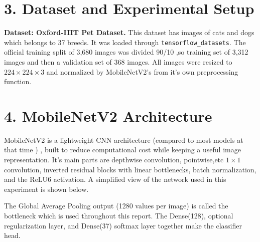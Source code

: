 \documentclass[10pt]{article}
\begin{document}
\section*{3. Dataset and Experimental Setup}

\textbf{Dataset: Oxford-IIIT Pet Dataset.} This dataset has  images of cats and dogs
which belongs to 37 breeds. It was loaded through \texttt{tensorflow\_datasets}. The official
training split of 3,680 images was divided 90/10 ,so training set of 3,312 images and then a 
validation set of 368 images.  All images were resized to $224 \times 224 \times 3$
and normalized by  MobileNetV2's from it's own preprocessing function.



\section*{4. MobileNetV2 Architecture}

MobileNetV2 is a lightweight CNN architecture (compared to most models at that time ) ,  built to reduce computational cost while keeping
a useful image representation. It's main parts  are depthwise convolution, pointwise,etc
$1 \times 1$ convolution, inverted residual blocks with linear bottlenecks, batch
normalization, and the ReLU6 activation. A simplified view of the network used in this
experiment is shown below.

\begin{center}
\end{center}

The Global Average Pooling output (1280 values per image) is called  the bottleneck which is  
used throughout this report. The Dense(128), optional regularization layer, and Dense(37)
softmax layer together make  the classifier head.
\end{document}
